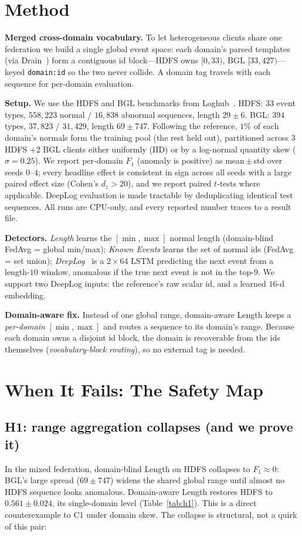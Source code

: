 \documentclass[conference]{IEEEtran}
\begin{document}
\section{Method}
\textbf{Merged cross-domain vocabulary.} To let heterogeneous clients share one federation we build a
single global event space: each domain's parsed templates (via Drain~\cite{he2017drain}) form a
contiguous id block---HDFS owns $[0,33)$, BGL $[33,427)$---keyed \texttt{domain:id} so the two never
collide. A domain tag travels with each sequence for per-domain evaluation.

\textbf{Setup.} We use the HDFS and BGL benchmarks from Loghub~\cite{zhu2023loghub}. HDFS: $33$ event
types, $558{,}223$ normal / $16{,}838$ abnormal sequences, length $29\pm6$. BGL: $394$ types,
$37{,}823$ / $31{,}429$, length $69\pm747$. Following the reference, $1\%$ of each domain's normals
form the training pool (the rest held out), partitioned across $3$ HDFS $+2$ BGL clients either
uniformly (IID) or by a log-normal quantity skew ($\sigma{=}0.25$). We report per-domain $F_1$ (anomaly
is positive) as mean\,$\pm$\,std over seeds $0$--$4$; every headline effect is consistent in sign across
all seeds with a large paired effect size (Cohen's $d_z{>}20$), and we report paired $t$-tests where
applicable. DeepLog evaluation is made tractable by deduplicating identical test sequences. All runs are
CPU-only, and every reported number traces to a result file.

\textbf{Detectors.} \emph{Length} learns the $[\min,\max]$ normal length (domain-blind FedAvg =
global min/max); \emph{Known Events} learns the set of normal ids (FedAvg = set union);
\emph{DeepLog}~\cite{du2017deeplog} is a $2\times64$ LSTM predicting the next event from a length-$10$
window, anomalous if the true next event is not in the top-$9$. We support two DeepLog inputs: the
reference's raw scalar id, and a learned $16$-d embedding.

\textbf{Domain-aware fix.} Instead of one global range, domain-aware Length keeps a \emph{per-domain}
$[\min,\max]$ and routes a sequence to its domain's range. Because each domain owns a disjoint id
block, the domain is recoverable from the ids themselves (\emph{vocabulary-block routing}), so no
external tag is needed.

\section{When It Fails: The Safety Map}
\subsection{H1: range aggregation collapses (and we prove it)}
In the mixed federation, domain-blind Length on HDFS collapses to $F_1\approx0$: BGL's large spread
($69\pm747$) widens the shared global range until almost no HDFS sequence looks anomalous. Domain-aware
Length restores HDFS to $0.561\pm0.024$, its single-domain level (Table~\ref{tab:h1}). This is a direct
counterexample to C1 under domain skew. The collapse is structural, not a quirk of this pair:
\end{document}
